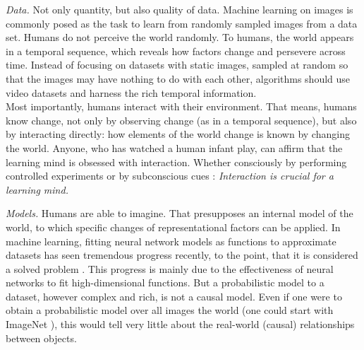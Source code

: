 	\emph{Data.}
		Not only quantity, but also quality of data. Machine learning on images is commonly posed as the task to learn from randomly sampled images from a data set. Humans do not perceive the world randomly.
		To humans, the world appears in a temporal sequence, which reveals how factors change and persevere across time. Instead of focusing on datasets with static images, sampled at random so that the images may have nothing to do with each other, algorithms should use video datasets and harness the rich temporal information.\\
		Most importantly, humans interact with their environment.
		That means, humans know change, not only by observing change (as in a temporal sequence), but also by interacting directly: how elements of the world change is known by changing the world.
		Anyone, who has watched a human infant play, can affirm that the learning mind is obsessed with interaction.
		Whether consciously by performing controlled experiments or by subconscious cues : \textit{Interaction is crucial for a learning mind.}


	\emph{Models.}
		Humans are able to imagine. That presupposes an internal model of the world, to which specific changes of representational factors can be applied.
		In machine learning, fitting neural network models as functions to approximate datasets has seen tremendous progress recently, to the point, that it is considered a solved problem . This progress is mainly due to the effectiveness of neural networks to fit high-dimensional functions. But a probabilistic model to a dataset, however complex and rich, is not a causal model. Even if one were to obtain a probabilistic model over all images the world (one could start with \eg ImageNet ), this would tell very little about the real-world (causal) relationships between objects.

